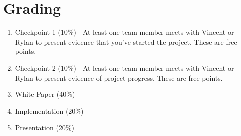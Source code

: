 \documentclass{article}
\begin{document}
\section*{Grading}
\begin{enumerate}
\item Checkpoint 1 (10\%) - At least one team member meets with Vincent or Rylan to present evidence that you've started the project. These are free points.
\item Checkpoint 2 (10\%) - At least one team member meets with Vincent or Rylan to present evidence of project progress. These are free points.
\item White Paper (40\%)
\item Implementation (20\%)
\item Presentation (20\%)
\end{enumerate}
\end{document}
